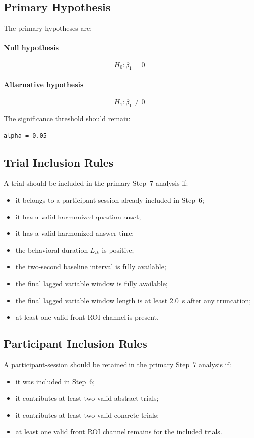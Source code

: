 \subsection{Primary Hypothesis}
The primary hypotheses are:

\paragraph{Null hypothesis}
\begin{equation}
H_0: \beta_1 = 0
\end{equation}

\paragraph{Alternative hypothesis}
\begin{equation}
H_1: \beta_1 \neq 0
\end{equation}

The significance threshold should remain:
\begin{verbatim}
alpha = 0.05
\end{verbatim}

\subsection{Trial Inclusion Rules}
A trial should be included in the primary Step~7 analysis if:
\begin{itemize}
    \item it belongs to a participant-session already included in Step~6;
    \item it has a valid harmonized question onset;
    \item it has a valid harmonized answer time;
    \item the behavioral duration \(L_{ik}\) is positive;
    \item the two-second baseline interval is fully available;
    \item the final lagged variable window is fully available;
    \item the final lagged variable window length is at least 2.0~s after any truncation;
    \item at least one valid front ROI channel is present.
\end{itemize}

\subsection{Participant Inclusion Rules}
A participant-session should be retained in the primary Step~7 analysis if:
\begin{itemize}
    \item it was included in Step~6;
    \item it contributes at least two valid abstract trials;
    \item it contributes at least two valid concrete trials;
    \item at least one valid front ROI channel remains for the included trials.
\end{itemize}

